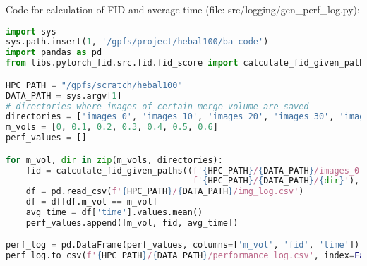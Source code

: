 \vfill
Code for calculation of FID and average time (file: src/logging/gen\_perf\_log.py):
\begin{lstlisting}[language=Python]
import sys       
sys.path.insert(1, '/gpfs/project/hebal100/ba-code')
import pandas as pd
from libs.pytorch_fid.src.fid.fid_score import calculate_fid_given_paths

HPC_PATH = "/gpfs/scratch/hebal100"
DATA_PATH = sys.argv[1] 
# directories where images of certain merge volume are saved
directories = ['images_0', 'images_10', 'images_20', 'images_30', 'images_40', 'images_50', 'images_60']
m_vols = [0, 0.1, 0.2, 0.3, 0.4, 0.5, 0.6]
perf_values = []

for m_vol, dir in zip(m_vols, directories):
    fid = calculate_fid_given_paths((f'{HPC_PATH}/{DATA_PATH}/images_0', 
                                     f'{HPC_PATH}/{DATA_PATH}/{dir}'), batch_size=50, device='cuda', dims=2048)
    df = pd.read_csv(f'{HPC_PATH}/{DATA_PATH}/img_log.csv')
    df = df[df.m_vol == m_vol]
    avg_time = df['time'].values.mean()
    perf_values.append([m_vol, fid, avg_time])

perf_log = pd.DataFrame(perf_values, columns=['m_vol', 'fid', 'time'])
perf_log.to_csv(f'{HPC_PATH}/{DATA_PATH}/performance_log.csv', index=False)
\end{lstlisting}
\vfill